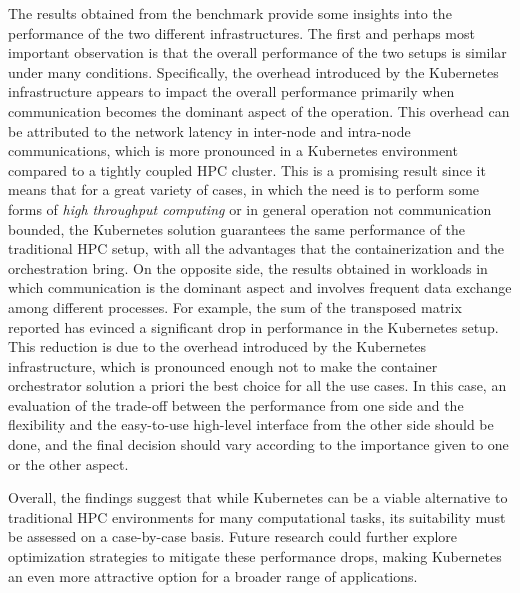The results obtained from the benchmark provide some insights into the
performance of the two different infrastructures. The first and perhaps most
important observation is that the overall performance of the two setups is
similar under many conditions. Specifically, the overhead introduced by the
Kubernetes infrastructure appears to impact the overall performance primarily
when communication becomes the dominant aspect of the operation. This overhead
can be attributed to the network latency in inter-node and intra-node
communications, which is more pronounced in a Kubernetes environment compared to
a tightly coupled HPC cluster. This is a promising result since it means that
for a great variety of cases, in which the need is to perform some forms of
\textit{high throughput computing} or in general operation not communication
bounded, the Kubernetes solution guarantees the same performance of the
traditional HPC setup, with all the advantages that the containerization and the
orchestration bring. On the opposite side, the results obtained in workloads in
which communication is the dominant aspect and involves frequent data exchange
among different processes. For example, the sum of the transposed matrix
reported has evinced a significant drop in performance in the Kubernetes setup.
This reduction is due to the overhead introduced by the Kubernetes
infrastructure, which is pronounced enough not to make the container
orchestrator solution a priori the best choice for all the use cases. In this
case, an evaluation of the trade-off between the performance from one side and
the flexibility and the easy-to-use high-level interface from the other side
should be done, and the final decision should vary according to the importance
given to one or the other aspect.

Overall, the findings suggest that while Kubernetes can be a viable alternative
to traditional HPC environments for many computational tasks, its suitability
must be assessed on a case-by-case basis. Future research could further explore
optimization strategies to mitigate these performance drops, making Kubernetes
an even more attractive option for a broader range of applications.
